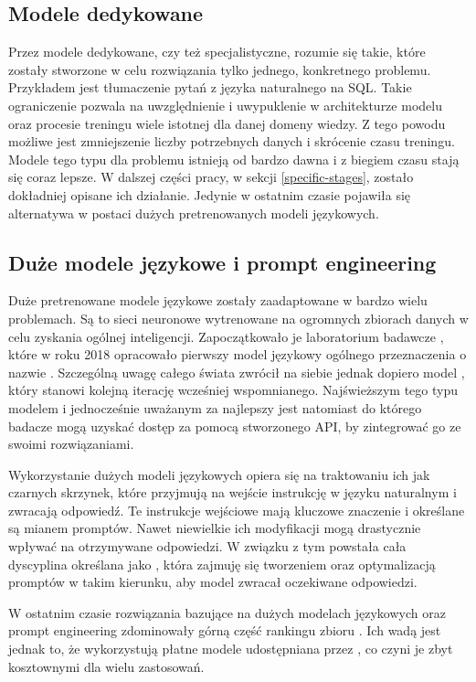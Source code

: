 \subsection{Modele dedykowane}
Przez modele dedykowane, czy też specjalistyczne, rozumie się takie, które zostały stworzone w celu rozwiązania tylko jednego, konkretnego problemu. Przykładem jest tłumaczenie pytań z języka naturalnego na SQL. Takie ograniczenie pozwala na uwzględnienie i uwypuklenie w architekturze modelu oraz procesie treningu wiele istotnej dla danej domeny wiedzy. Z tego powodu możliwe jest zmniejszenie liczby potrzebnych danych i skrócenie czasu treningu. Modele tego typu dla problemu  istnieją od bardzo dawna i z biegiem czasu stają się coraz lepsze. W dalszej części pracy, w sekcji \ref{specific-stages}, zostało dokładniej opisane ich działanie. Jedynie w ostatnim czasie pojawiła się alternatywa w postaci dużych pretrenowanych modeli językowych.

\subsection{Duże modele językowe i prompt engineering}
Duże pretrenowane modele językowe zostały zaadaptowane w bardzo wielu problemach. Są to sieci neuronowe wytrenowane na ogromnych zbiorach danych w celu zyskania ogólnej inteligencji. Zapoczątkowało je laboratorium badawcze , które w roku 2018 opracowało pierwszy model językowy ogólnego przeznaczenia o nazwie  \cite{Openai2018}. Szczególną uwagę całego świata zwrócił na siebie jednak dopiero model , który stanowi kolejną iterację wcześniej wspomnianego. Najświeższym tego typu modelem i jednocześnie uważanym za najlepszy jest natomiast  do którego badacze mogą uzyskać dostęp za pomocą stworzonego API, by zintegrować go ze swoimi rozwiązaniami.

Wykorzystanie dużych modeli językowych opiera się na traktowaniu ich jak czarnych skrzynek, które przyjmują na wejście instrukcję w języku naturalnym i zwracają odpowiedź. Te instrukcje wejściowe mają kluczowe znaczenie i określane są mianem promptów. Nawet niewielkie ich modyfikacji mogą drastycznie wpływać na otrzymywane odpowiedzi. W związku z tym powstała cała dyscyplina określana jako , która zajmuję się tworzeniem oraz optymalizacją promptów w takim kierunku, aby model zwracał oczekiwane odpowiedzi.

W ostatnim czasie rozwiązania bazujące na dużych modelach językowych oraz prompt engineering zdominowały górną część rankingu zbioru . Ich wadą jest jednak to, że wykorzystują płatne modele udostępniana przez , co czyni je zbyt kosztownymi dla wielu zastosowań.

